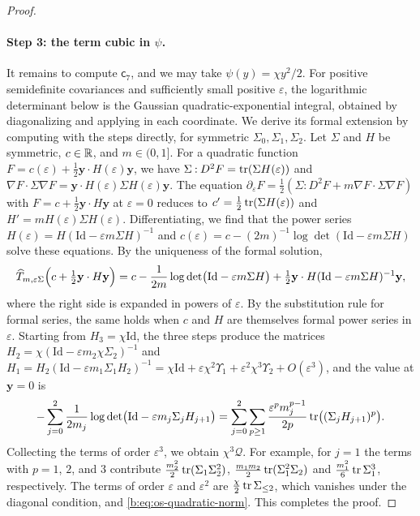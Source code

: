 \begin{proof}
\paragraph{Step 3: the term cubic in $\psi$.} It remains to compute $\mathsf c_7$, and
we may take $\psi(y)=\chi y^2/2$. For positive semidefinite covariances and
sufficiently small positive $\varepsilon$, the
logarithmic determinant below is the Gaussian quadratic-exponential integral,
obtained by diagonalizing and applying \cite[(A.11)]{talagrand-2011} in each
coordinate. We derive its formal extension by computing with the steps directly, for
symmetric $\Sigma_0,\Sigma_1,\Sigma_2$. Let $\Sigma$ and $H$ be symmetric,
$c\in\mathbb R$, and $m\in(0,1]$. For a quadratic function
$F=c(\varepsilon)+\frac12\mathbf y\cdot H(\varepsilon)\mathbf y$, we have
$\Sigma\mathbin:D^2F=\operatorname{tr}(\Sigma H(\varepsilon))$ and
$\nabla F\cdot\Sigma\nabla F=\mathbf y\cdot H(\varepsilon)\Sigma H(\varepsilon)\mathbf y$.
The equation $\partial_\varepsilon F=\frac12(\Sigma\mathbin:D^2F+m\nabla
F\cdot\Sigma\nabla F)$ with $F=c+\frac12\mathbf y\cdot H\mathbf y$ at
$\varepsilon=0$ reduces to $c'=\frac12\operatorname{tr}(\Sigma H(\varepsilon))$ and
$H'=mH(\varepsilon)\Sigma H(\varepsilon)$. Differentiating, we find that the
power series $H(\varepsilon)=H(\mathrm{Id}-\varepsilon m\Sigma H)^{-1}$ and
$c(\varepsilon)=c-(2m)^{-1}\log\det(\mathrm{Id}-\varepsilon m\Sigma H)$ solve these
equations. By the uniqueness of the formal solution,
\[
 \widehat T_{m,\varepsilon\Sigma}\Bigl(c+\tfrac12\mathbf y\cdot H\mathbf y\Bigr)
 =c-\frac1{2m}\log\det\bigl(\mathrm{Id}-\varepsilon m\Sigma H\bigr)
 +\tfrac12\mathbf y\cdot H(\mathrm{Id}-\varepsilon m\Sigma H)^{-1}\mathbf y,
\]
where the right side is expanded in powers of $\varepsilon$. By the
substitution rule for formal series, the same holds when $c$ and $H$ are
themselves formal power series in $\varepsilon$. Starting from $H_3=\chi \mathrm{Id}$, the three steps produce the matrices
$H_2=\chi(\mathrm{Id}-\varepsilon m_2\chi\Sigma_2)^{-1}$ and
$H_1=H_2(\mathrm{Id}-\varepsilon m_1\Sigma_1H_2)^{-1}=\chi \mathrm{Id}+\varepsilon\chi^2\Upsilon_1
+\varepsilon^2\chi^3\Upsilon_2+O(\varepsilon^3)$, and the value at $\mathbf y=0$ is
\[
 -\sum_{j=0}^2\frac1{2m_j}\log\det\bigl(\mathrm{Id}-\varepsilon m_j\Sigma_jH_{j+1}\bigr)
 =\sum_{j=0}^2\sum_{p\ge1}\frac{\varepsilon^pm_j^{p-1}}{2p}\operatorname{tr}\bigl((\Sigma_jH_{j+1})^p\bigr).
\]
Collecting the terms of order $\varepsilon^3$, we obtain $\chi^3\mathcal Q$. For
example, for $j=1$ the terms with $p=1$, $2$, and $3$ contribute
$\frac{m_2^2}2\operatorname{tr}(\Sigma_1\Sigma_2^2)$, $\frac{m_1m_2}2\operatorname{tr}(\Sigma_1^2\Sigma_2)$ and
$\frac{m_1^2}6\operatorname{tr}\Sigma_1^3$, respectively. The terms of order $\varepsilon$ and
$\varepsilon^2$ are $\frac\chi2\operatorname{tr}\Sigma_{\le2}$, which vanishes under the
diagonal condition, and \eqref{b:eq:os-quadratic-norm}. This completes the
proof.
\end{proof}

